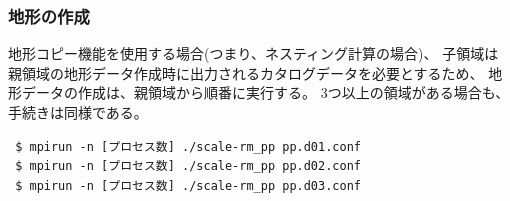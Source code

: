 

\subsubsection{地形の作成}

地形コピー機能を使用する場合(つまり、ネスティング計算の場合)、
子領域は親領域の地形データ作成時に出力されるカタログデータを必要とするため、
地形データの作成は、親領域から順番に実行する。
3つ以上の領域がある場合も、手続きは同様である。

\begin{verbatim}
 $ mpirun -n [プロセス数] ./scale-rm_pp pp.d01.conf
 $ mpirun -n [プロセス数] ./scale-rm_pp pp.d02.conf
 $ mpirun -n [プロセス数] ./scale-rm_pp pp.d03.conf
\end{verbatim}


